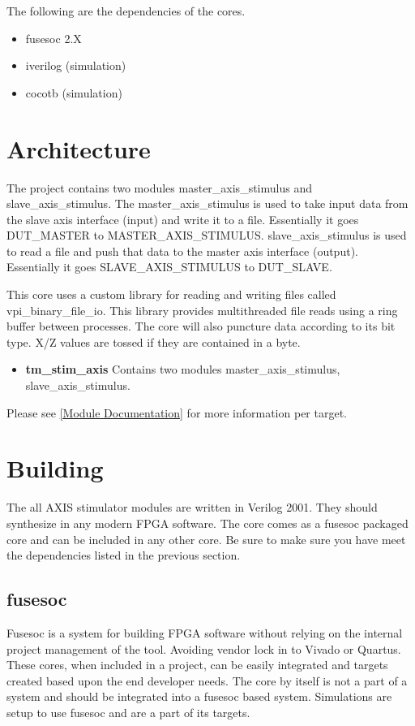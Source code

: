 \par
The following are the dependencies of the cores.

\begin{itemize}
  \item fusesoc 2.X
  \item iverilog (simulation)
  \item cocotb (simulation)
\end{itemize}



\section{Architecture}
\par
The project contains two modules master\_axis\_stimulus and slave\_axis\_stimulus. The master\_axis\_stimulus is used to take
input data from the slave axis interface (input) and write it to a file. Essentially it goes DUT\_MASTER to MASTER\_AXIS\_STIMULUS.
slave\_axis\_stimulus is used to read a file and push that data to the master axis interface (output). Essentially it goes
SLAVE\_AXIS\_STIMULUS to DUT\_SLAVE.
\par
This core uses a custom library for reading and writing files called vpi\_binary\_file\_io. This library provides multithreaded file reads
using a ring buffer between processes. The core will also puncture data according to its bit type. X/Z values are tossed if they are contained
in a byte.

\begin{itemize}
  \item \textbf{tm\_stim\_axis} Contains two modules master\_axis\_stimulus, slave\_axis\_stimulus.
\end{itemize}

Please see \ref{Module Documentation} for more information per target.

\section{Building}

\par
The all AXIS stimulator modules are written in Verilog 2001. They should synthesize in any modern FPGA software. The core comes as a fusesoc packaged core and can be
included in any other core. Be sure to make sure you have meet the dependencies listed in the previous section.

\subsection{fusesoc}
\par
Fusesoc is a system for building FPGA software without relying on the internal project management of the tool. Avoiding vendor lock in to Vivado or Quartus.
These cores, when included in a project, can be easily integrated and targets created based upon the end developer needs. The core by itself is not a part of
a system and should be integrated into a fusesoc based system. Simulations are setup to use fusesoc and are a part of its targets.

